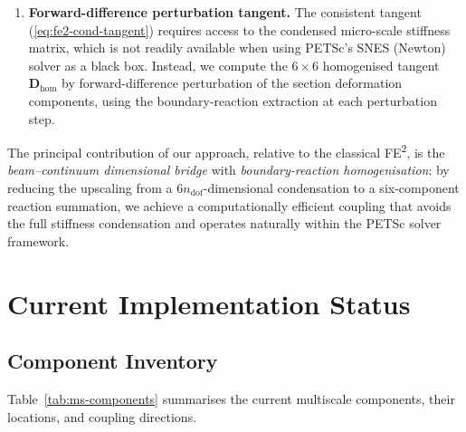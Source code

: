 \begin{enumerate}[label=(\arabic*)]
  \item \textbf{Forward-difference perturbation tangent.}
    The consistent tangent (\ref{eq:fe2-cond-tangent}) requires
    access to the condensed micro-scale stiffness matrix, which is
    not readily available when using PETSc's SNES (Newton) solver as
    a black box.  Instead, we compute the $6 \times 6$ homogenised
    tangent $\mathbf{D}_{\text{hom}}$ by forward-difference
    perturbation of the section deformation components, using the
    boundary-reaction extraction at each perturbation step.
\end{enumerate}

\noindent
The principal contribution of our approach, relative to the classical
FE\textsuperscript{2}, is the \emph{beam--continuum dimensional
bridge} with \emph{boundary-reaction homogenisation}: by reducing
the upscaling from a $6n_{\text{dof}}$-dimensional condensation to a
six-component reaction summation, we achieve a computationally
efficient coupling that avoids the full stiffness condensation and
operates naturally within the PETSc solver framework.


\section{Current Implementation Status}
\label{sec:ms-current-status}

\subsection{Component Inventory}

Table~\ref{tab:ms-components} summarises the current multiscale
components, their locations, and coupling directions.

